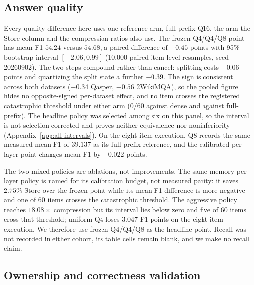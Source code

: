 \documentclass{article}
\begin{document}


\subsection{Answer quality}
\label{sec:quality}

Every quality difference here uses one reference arm, full-prefix Q16, the arm
the Store column and the compression ratios also use.  The frozen Q4/Q4/Q8
point has mean F1 $54.24$ versus $54.68$, a paired difference of $-0.45$ points
with 95\% bootstrap interval $[-2.06,0.99]$ (10,000 paired item-level
resamples, seed 20260902). The two steps compound rather than cancel: splitting
costs $-0.06$ points and quantizing the split state a further $-0.39$. The sign
is consistent across both datasets ($-0.34$ Qasper, $-0.56$ 2WikiMQA), so the
pooled figure hides no opposite-signed per-dataset effect, and no item crosses
the registered catastrophic threshold under either arm (0/60 against dense and
against full-prefix). The headline policy was selected among six on this panel,
so the interval is not selection-corrected and proves neither equivalence nor
noninferiority (Appendix~\ref{app:all-intervals}). On the eight-item execution, Q8 records the same measured mean
F1 of $39.137$ as its full-prefix reference, and the calibrated per-layer point
changes mean F1 by $-0.022$ points.

The two mixed policies are ablations, not improvements.  The same-memory
per-layer policy is named for its calibration budget, not measured parity: it
saves $2.75\%$ Store over the frozen point while its mean-F1 difference is more
negative and one of 60 items crosses the catastrophic threshold.  The
aggressive policy reaches $18.08\times$ compression but its interval lies below
zero and five of 60 items cross that threshold; uniform Q4 loses $3.047$ F1
points on the eight-item execution.  We therefore use frozen Q4/Q4/Q8 as the
headline point.  Recall was not recorded in either cohort, its table cells
remain blank, and we make no recall claim.

\subsection{Ownership and correctness validation}
\label{sec:correctness}
\label{sec:results}
\end{document}
